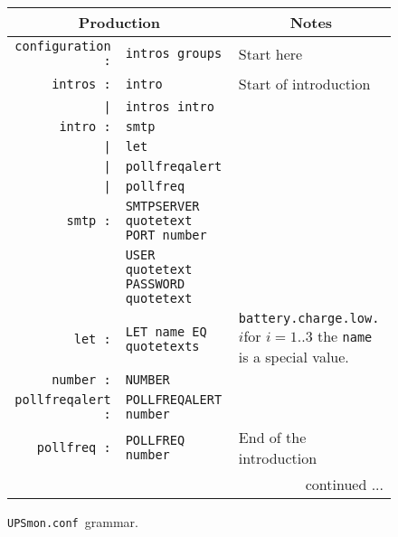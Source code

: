 \documentclass[12pt]{article}
\newcommand{\UPSmonconf}{\textcolor{UPSMONCOLOUR}{\texttt{UPSmon.conf}}}
\begin{document}
\begin{figure}[ht]
\begin{center}
\begin{tabular}{|rp{0.55\LinePrinterwidth}|p{0.35\LinePrinterwidth}|}
\hline
\multicolumn{2}{|c|}{\textbf{Production}} & \multicolumn{1}{|c|}{\textbf{Notes}} \\ \hline\hline
\texttt{configuration :}   & \texttt{intros groups} & Start here \\ \hline\hline
\texttt{intros :}          & \texttt{intro} & Start of introduction \\
       \texttt{|}          & \texttt{intros intro} & \\ \hline
\texttt{intro :}           & \texttt{smtp} & \\
      \texttt{|}           & \texttt{let} & \\
      \texttt{|}           & \texttt{pollfreqalert} & \\
      \texttt{|}           & \texttt{pollfreq} & \\ \hline
\texttt{smtp :}            & \texttt{SMTPSERVER quotetext PORT number} & \\
                           & \texttt{USER quotetext PASSWORD quotetext} & \\ \hline
\texttt{let :}             & \texttt{LET name EQ quotetexts} 
                           & \texttt{battery.charge.low.}$i$\hfill for $i=1..3$
                             the \texttt{name} is a special value. \\ \hline
\texttt{number :}          & \texttt{NUMBER} & \\ \hline
\texttt{pollfreqalert :}   & \texttt{POLLFREQALERT number} & \\ \hline
\texttt{pollfreq :}        & \texttt{POLLFREQ number} & End of the introduction \\ \hline\hline
\multicolumn{3}{|r|}{\small continued ...} \\ \hline
\end{tabular}
\caption{\UPSmonconf\ grammar.\label{fig:yacc}}
\end{center}
\end{figure}
\end{document}
